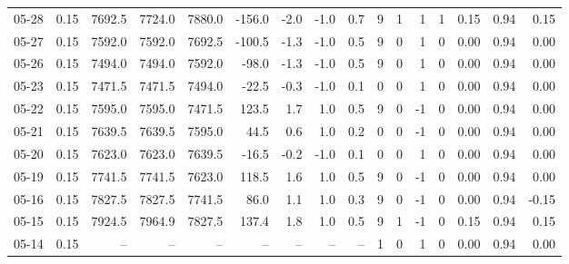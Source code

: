 \begin{threeparttable}
{\begin{tabular}{lrrrrrrrrrrrrrrr}
  05-28 &     0.15 & 7692.5 & 7724.0 & 7880.0 &     -156.0 &           -2.0 &                     -1.0 &                 0.7 &              9 &         1 &     1 &         1 &       0.15 &      0.94 &           0.15 \\
  05-27 &     0.15 & 7592.0 & 7592.0 & 7692.5 &     -100.5 &           -1.3 &                     -1.0 &                 0.5 &              9 &         0 &     1 &         0 &       0.00 &      0.94 &           0.00 \\
  05-26 &     0.15 & 7494.0 & 7494.0 & 7592.0 &      -98.0 &           -1.3 &                     -1.0 &                 0.5 &              9 &         0 &     1 &         0 &       0.00 &      0.94 &           0.00 \\
  05-23 &     0.15 & 7471.5 & 7471.5 & 7494.0 &      -22.5 &           -0.3 &                     -1.0 &                 0.1 &              0 &         0 &     1 &         0 &       0.00 &      0.94 &           0.00 \\
  05-22 &     0.15 & 7595.0 & 7595.0 & 7471.5 &      123.5 &            1.7 &                      1.0 &                 0.5 &              9 &         0 &    -1 &         0 &       0.00 &      0.94 &           0.00 \\
  05-21 &     0.15 & 7639.5 & 7639.5 & 7595.0 &       44.5 &            0.6 &                      1.0 &                 0.2 &              0 &         0 &    -1 &         0 &       0.00 &      0.94 &           0.00 \\
  05-20 &     0.15 & 7623.0 & 7623.0 & 7639.5 &      -16.5 &           -0.2 &                     -1.0 &                 0.1 &              0 &         0 &     1 &         0 &       0.00 &      0.94 &           0.00 \\
  05-19 &     0.15 & 7741.5 & 7741.5 & 7623.0 &      118.5 &            1.6 &                      1.0 &                 0.5 &              9 &         0 &    -1 &         0 &       0.00 &      0.94 &           0.00 \\
  05-16 &     0.15 & 7827.5 & 7827.5 & 7741.5 &       86.0 &            1.1 &                      1.0 &                 0.3 &              9 &         0 &    -1 &         0 &       0.00 &      0.94 &          -0.15 \\
  05-15 &     0.15 & 7924.5 & 7964.9 & 7827.5 &      137.4 &            1.8 &                      1.0 &                 0.5 &              9 &         1 &    -1 &         0 &       0.15 &      0.94 &           0.15 \\
  05-14 &     0.15 &     -- &     -- &     -- &         -- &             -- &                       -- &                  -- &              1 &         0 &     1 &         0 &       0.00 &      0.94 &           0.00 \\

\end{tabular}}
\end{threeparttable}
